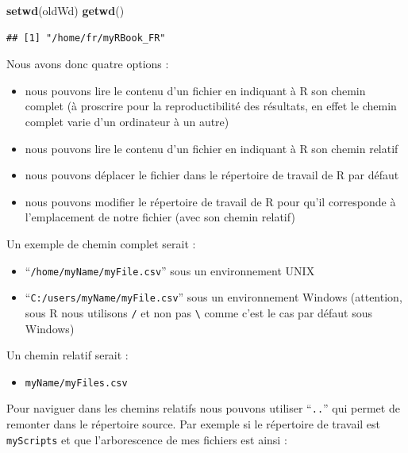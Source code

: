 \documentclass[twoside,symmetric]{book}
\newenvironment{Shaded}{}{}
\newcommand{\KeywordTok}[1]{\textbf{#1}}
\newcommand{\NormalTok}[1]{#1}
\providecommand{\tightlist}{%
  \setlength{\itemsep}{0pt}\setlength{\parskip}{0pt}}
\begin{document}
\begin{Shaded}
\begin{Highlighting}[]
\KeywordTok{setwd}\NormalTok{(oldWd)}
\KeywordTok{getwd}\NormalTok{()}
\end{Highlighting}
\end{Shaded}

\begin{verbatim}
## [1] "/home/fr/myRBook_FR"
\end{verbatim}

Nous avons donc quatre options :

\begin{itemize}
\tightlist
\item
  nous pouvons lire le contenu d'un fichier en indiquant à R son chemin complet (à proscrire pour la reproductibilité des résultats, en effet le chemin complet varie d'un ordinateur à un autre)
\item
  nous pouvons lire le contenu d'un fichier en indiquant à R son chemin relatif
\item
  nous pouvons déplacer le fichier dans le répertoire de travail de R par défaut
\item
  nous pouvons modifier le répertoire de travail de R pour qu'il corresponde à l'emplacement de notre fichier (avec son chemin relatif)
\end{itemize}

Un exemple de chemin complet serait :

\begin{itemize}
\tightlist
\item
  ``\texttt{/home/myName/myFile.csv}'' sous un environnement UNIX
\item
  ``\texttt{C:/users/myName/myFile.csv}'' sous un environnement Windows (attention, sous R nous utilisons \texttt{/} et non pas \texttt{\textbackslash{}} comme c'est le cas par défaut sous Windows)
\end{itemize}

Un chemin relatif serait :

\begin{itemize}
\tightlist
\item
  \texttt{myName/myFiles.csv}
\end{itemize}

Pour naviguer dans les chemins relatifs nous pouvons utiliser ``\texttt{..}'' qui permet de remonter dans le répertoire source. Par exemple si le répertoire de travail est \texttt{myScripts} et que l'arborescence de mes fichiers est ainsi :
\end{document}
